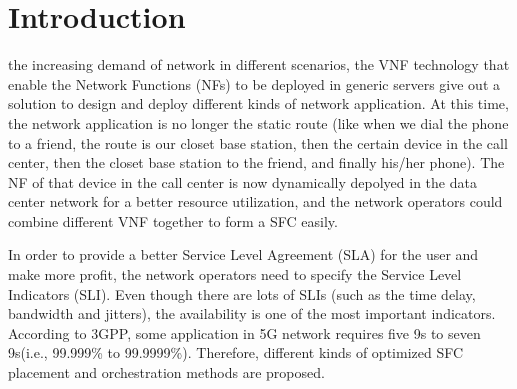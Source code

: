 \documentclass[journal]{IEEEtran}
\begin{document}
%
    \IEEEpeerreviewmaketitle


    \section{Introduction}
% 
% 
% 
% 
     the increasing demand of network in different scenarios, the VNF technology that enable the Network
    Functions (NFs) to be deployed in generic servers give out a solution to design and deploy different kinds of network
    application. At this time, the network application is no longer the static route (like when we dial the phone to a friend,
    the route is our closet base station, then the certain device in the call center, then the closet base station to the
    friend, and finally his/her phone). The NF of that device in the call center is now dynamically depolyed in the data center
    network for a better resource utilization, and the network operators could combine different VNF together to form
    a SFC easily.

    In order to provide a better Service Level Agreement (SLA) for the user and make more profit, the network operators need
    to specify the Service Level Indicators (SLI)\cite{beyer2016site}. Even though there are lots of SLIs (such as the time 
    delay, bandwidth and jitters), the availability is one of the most important indicators. According to 3GPP, some application
    in 5G network requires five 9s to seven 9s(i.e., 99.999\% to 99.9999\%). Therefore, different kinds of optimized SFC placement
 	and orchestration methods are proposed\cite{AlahmadAgarwal-754,wang2021availability,qu2018reliability,qu2019reliability}.
 	
\end{document}
